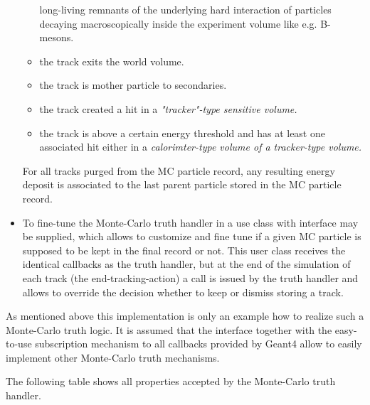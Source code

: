 \begin{itemize}
\begin{itemize}
		        long-living remnants of the underlying hard interaction
		        of particles decaying macroscopically inside the
		        experiment volume like e.g. B-mesons.
		  \item the track exits the world volume.
		  \item the track is mother particle to secondaries.
		  \item the track created a hit in a \it{"tracker"}-type
		        sensitive volume.
		  \item the track is above a certain energy threshold and
		  		has at least one associated hit either in a 
		  		\it{calorimter}-type volume of a \it{tracker}-type
		  		volume.
	  \end{itemize}
	  For all tracks purged from the MC particle record, any resulting
	  energy deposit is associated to the last parent particle 
	  stored in the MC particle record.
\item To fine-tune the Monte-Carlo truth handler in \DDG a 
	  use class with interface   
	  may be supplied, which allows to customize and fine tune
	  if a given MC particle is supposed to be kept in the final
	  record or not. This user class receives the identical callbacks
	  as the truth handler, but at the end of the simulation of each
	  track (the end-tracking-action) a call is issued by the truth
	  handler and allows to override the decision whether to keep
	  or dismiss storing a track.
\end{itemize}

\noindent
As mentioned above this implementation is only an example how
to realize such a Monte-Carlo truth logic. It is assumed that the
interface  together with the easy-to-use
subscription mechanism to all callbacks provided by Geant4
allow to easily implement other Monte-Carlo truth mechanisms.

\vspace{0.3cm}
\noindent
The following table shows all properties accepted by the 
\DDG Monte-Carlo truth handler.

